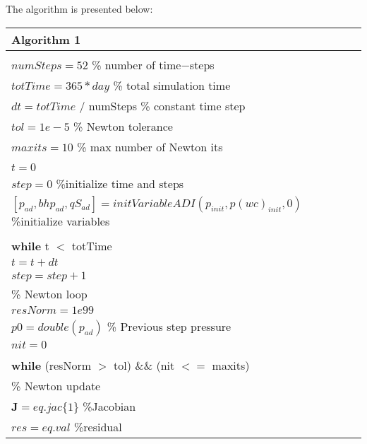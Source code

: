 \documentclass[12pt]{report}
\begin{document}
The algorithm is presented below:\\
\begin{table}[!ht]
{\tabulinesep=1.11mm \begin{tabu}{ |l |} 
\hline
  \textbf{Algorithm 1} \\
  \hline
 \hline
\\
$numSteps = 52$ \% number of time−steps\\
$totTime = 365*day$ \% total simulation time\\
$dt = totTime$ / numSteps \% constant time step\\
$tol = 1e−5$ \% Newton tolerance\\
$maxits = 10$ \% max number of Newton its\\
\\
$t = 0$\\ $step = 0$ \%initialize time and steps\\
$[p_{ad},bhp_{ad},qS_{ad}]=initVariableADI(p_{init},p(wc)_{init},0)$  \hspace{1cm} \%initialize variables\\
\\
\hspace{0.5cm}\textbf{while} t $<$ totTime\\
 \hspace{1cm} $t = t + dt$\\ 
 \hspace{1cm}$step = step + 1$\\
  \hspace{1cm}\% Newton loop \\
 \hspace{1cm} $resNorm = 1e99$\\
 \hspace{1cm} $p0 = double(p_{ad})$ \hspace{2cm}\% Previous step pressure\\
 \hspace{1cm} $nit = 0$\\ \\
 \hspace{1cm} \textbf{while} (resNorm $>$ tol) \&\& (nit $<=$ maxits)\\
 \hspace{1.5cm}  \% Newton update\\
 \hspace{2cm}  $\mathbf{J}=eq.jac\{1\}$ \hspace{1.5cm}  \%Jacobian\\
\hspace{2cm}$res=eq.val$  \hspace{2cm} \%residual\\

\end{tabu}}
\end{table}
\end{document}
